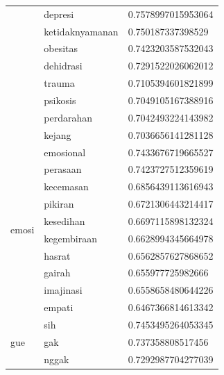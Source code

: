 \begin{enumerate}
\begin{longtable}[c]{|l|l|l|}
                                  & depresi         & 0.7578997015953064  \\ \cline{2-3}
                                  & ketidaknyamanan & 0.750187337398529   \\ \cline{2-3}
                                  & obesitas        & 0.7423203587532043  \\ \cline{2-3}
                                  & dehidrasi       & 0.7291522026062012  \\ \cline{2-3}
                                  & trauma          & 0.7105394601821899  \\ \cline{2-3}
                                  & psikosis        & 0.7049105167388916  \\ \cline{2-3}
                                  & perdarahan      & 0.7042493224143982  \\ \cline{2-3}
                                  & kejang          & 0.7036656141281128  \\ \hline
    \multirow[t]{10}{*}{emosi}    & emosional       & 0.7433676719665527  \\ \cline{2-3}
                                  & perasaan        & 0.7423727512359619  \\ \cline{2-3}
                                  & kecemasan       & 0.6856439113616943  \\ \cline{2-3}
                                  & pikiran         & 0.6721306443214417  \\ \cline{2-3}
                                  & kesedihan       & 0.6697115898132324  \\ \cline{2-3}
                                  & kegembiraan     & 0.6628994345664978  \\ \cline{2-3}
                                  & hasrat          & 0.6562857627868652  \\ \cline{2-3}
                                  & gairah          & 0.655977725982666   \\ \cline{2-3}
                                  & imajinasi       & 0.6558658480644226  \\ \cline{2-3}
                                  & empati          & 0.6467366814613342  \\ \hline
    \multirow[t]{10}{*}{gue}      & sih             & 0.7453495264053345  \\ \cline{2-3}
                                  & gak             & 0.737358808517456   \\ \cline{2-3}
                                  & nggak           & 0.7292987704277039  \\ \cline{2-3}

\end{longtable}
\end{enumerate}
